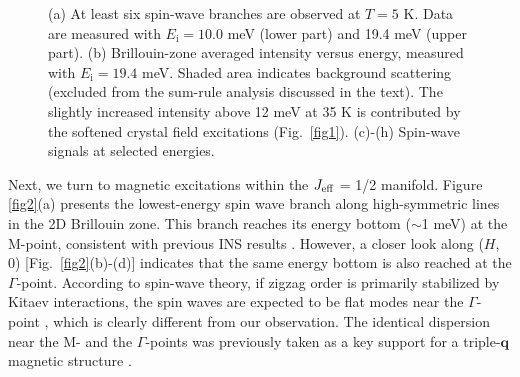 \documentclass[%
reprint,
superscriptaddress,
amsmath,amssymb,
aps,
prb,
]{revtex4-2}
\begin{document}
\begin{figure}[t!]
\caption{(a) At least six spin-wave branches are observed at $T=5$ K. Data are measured with $E_\mathrm{i} = 10.0$ meV (lower part) and 19.4 meV (upper part). (b) Brillouin-zone averaged intensity versus energy, measured with $E_\mathrm{i} = 19.4$ meV. Shaded area indicates background scattering (excluded from the sum-rule analysis discussed in the text). The slightly increased intensity above 12 meV at 35 K is contributed by the softened crystal field excitations (Fig.~\ref{fig1}). (c)-(h) Spin-wave signals at selected energies.}
\label{fig3}
\end{figure}
	
Next, we turn to magnetic excitations within the $J_{\rm{eff}}$ = 1/2 manifold. Figure \ref{fig2}(a) presents the lowest-energy spin wave branch along high-symmetric lines in the 2D Brillouin zone. This branch reaches its energy bottom ($\sim$1 meV) at the M-point, consistent with previous INS results \cite{SongvilayPRB2020,LinNC2021,SamarakoonPRB2021,KimJPCM2021,SandersArxiv2021}. However, a closer look along ($H$, 0) [Fig.~\ref{fig2}(b)-(d)] indicates that the same energy bottom is also reached at the $\Gamma$-point. According to spin-wave theory, if zigzag order is primarily stabilized by Kitaev interactions, the spin waves are expected to be flat modes near the $\Gamma$-point \cite{ChaloupkaPRL2013,BanerjeeNM2016}, which is clearly different from our observation. The identical dispersion near the M- and the $\Gamma$-points was previously taken as a key support for a triple-$\mathbf{q}$ magnetic structure \cite{XPRB2021}.
\end{document}
